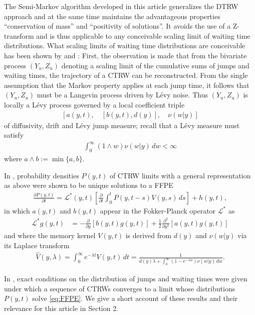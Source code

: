 \documentclass[a4paper,12pt]{elsarticle}
\numberwithin{equation}{section}
\theoremstyle{plain}
\theoremstyle{definition}
\theoremstyle{remark}
\numberwithin{equation}{section}
\newcommand{\1}{\mathbf 1}
\newcommand{\del}{\partial}
\begin{document}
The Semi-Markov algorithm developed in this article generalizes the DTRW approach and at the same time maintains the advantageous properties ``conservation of mass'' and ``positivity of solutions''.  It avoids the use of a Z-transform and is thus applicable to any conceivable scaling limit of waiting time distributions.  What scaling limits of waiting time distributions are conceivable has been shown by \cite{Straka17} and \cite{BaeumerStraka16}:  First, the observation is made that from the bivariate process $(Y_u, Z_u)$ denoting a scaling limit of the cumulative sums of jumps and waiting times, the trajectory of a CTRW can be reconstructed.  
From the single assumption that the Markov property applies at each jump time, it follows that $(Y_u,Z_u)$ must be a Langevin process driven by L\'evy noise. 
Thus $(Y_u, Z_u)$ is locally a L\'evy process governed by a local coefficient triple 
\begin{align} \label{eq:triple}
[a(y,t), \quad [b(y,t), d(y)], \quad \nu(w|y)]
\end{align}
of diffusivity, drift  and L\'evy jump measure; recall that a L\'evy measure must satisfy
\begin{align}
\label{eq:Levy-measure}
\int_0^\infty (1 \wedge w) \nu(w|y)\,dw < \infty
\end{align}
where $a \wedge b := \min\{a, b\}$. 

In \citep{BaeumerStraka16}, probability densities $P(y,t)$ of CTRW limits with a general representation as above were shown to be unique solutions to a FFPE 
\begin{align} \label{eq:FFPE}
\frac{\del P(y,t)}{\del t} = \mathcal L^*(y,t) \left[ \frac{\partial}{\partial t}
\int_0^t P(y,t-s) V(y,s)\,ds \right] + h(y,t),
\end{align}
in which $a(y,t)$ and $b(y,t)$ appear in the Fokker-Planck operator 
$\mathcal L^*$ as 
\begin{align}
\label{eq:FPop}
\mathcal L^* g(y,t)
&= -\frac{\partial }{\partial y}[b(y,t) g(y,t)]
+\frac{1}{2}\frac{\partial^2 }{\partial y^2}[a(y,t) g(y,t)]
\end{align}
and where the memory kernel $V(y,t)$ is derived from $d(y)$ and $\nu(w|y)$ via its Laplace transform
\begin{align} \label{eq:LT-renewal-measure}
\hat V(y,\lambda) = \int_0^\infty e^{-\lambda t} V(y,t)\,dt
= \frac{1}{d(y)\lambda + \int_0^\infty (1-e^{-\lambda w})
\nu(w | y)\,dw}.
\end{align}

In \citep{Straka17}, exact conditions on the distribution of jumps and waiting times were given under which a sequence of CTRWs converges to a limit whose distributions $P(y,t)$ solve \eqref{eq:FFPE}. 
We give a short account of these results and their relevance for this article in Section 2. 
\end{document}
